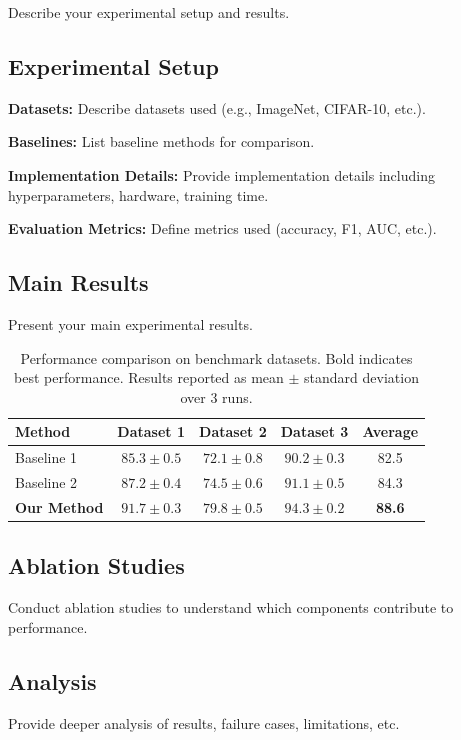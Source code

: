 \documentclass{article}
\begin{document}
Describe your experimental setup and results.

\subsection{Experimental Setup}
\textbf{Datasets:} Describe datasets used (e.g., ImageNet, CIFAR-10, etc.).

\textbf{Baselines:} List baseline methods for comparison.

\textbf{Implementation Details:} Provide implementation details including hyperparameters, hardware, training time.

\textbf{Evaluation Metrics:} Define metrics used (accuracy, F1, AUC, etc.).

\subsection{Main Results}
Present your main experimental results.

\begin{table}[t]
\centering
\caption{Performance comparison on benchmark datasets. Bold indicates best performance. Results reported as mean $\pm$ standard deviation over 3 runs.}
\label{tab:main_results}
\begin{tabular}{lcccc}
\toprule
Method & Dataset 1 & Dataset 2 & Dataset 3 & Average \\
\midrule
Baseline 1 & $85.3 \pm 0.5$ & $72.1 \pm 0.8$ & $90.2 \pm 0.3$ & 82.5 \\
Baseline 2 & $87.2 \pm 0.4$ & $74.5 \pm 0.6$ & $91.1 \pm 0.5$ & 84.3 \\
\textbf{Our Method} & $\mathbf{91.7 \pm 0.3}$ & $\mathbf{79.8 \pm 0.5}$ & $\mathbf{94.3 \pm 0.2}$ & \textbf{88.6} \\
\bottomrule
\end{tabular}
\end{table}

\subsection{Ablation Studies}
Conduct ablation studies to understand which components contribute to performance.

\subsection{Analysis}
Provide deeper analysis of results, failure cases, limitations, etc.
\end{document}
